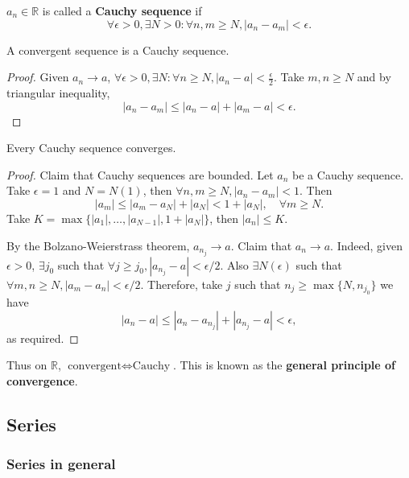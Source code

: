 \begin{definition}
    $a_n\in \mathbb{R}$ is called a \textbf{Cauchy sequence} if 
    \[
        \forall \epsilon>0, \exists N>0: \forall n,m\ge N, \left| a_n-a_m \right| <\epsilon.
    \]
\end{definition}

\begin{lemma}\label{lma:convergent -> cauchy}
    A convergent sequence is a Cauchy sequence.
\end{lemma}
\begin{proof}
    Given $ a_n\to a $, $ \forall \epsilon>0, \exists N: \forall n\ge N, |a_n-a|<\frac{\epsilon}{2} $. Take $m,n\ge N$ and by triangular inequality,
    \[
        |a_n-a_m|\le |a_n-a|+|a_m-a|<\epsilon.
    \]
\end{proof}

\begin{theorem}\label{thm:cauchy -> convergent}
    Every Cauchy sequence converges.
\end{theorem}
\begin{proof}
    Claim that Cauchy sequences are bounded. Let $a_n$ be a Cauchy sequence. Take $\epsilon=1$ and $N=N(1)$, then $ \forall n,m\ge N, |a_n-a_m|<1 $. Then
    \[
        |a_m|\le |a_m-a_N|+|a_N|<1+|a_N|, \quad \forall m\ge N.
    \]
    Take $ K= \max\{|a_1|,\dots,|a_{N-1}|, 1+|a_N|\} $, then $|a_n|\le K$.

    By the Bolzano-Weierstrass theorem, $ a_{n_j}\to a $. Claim that $a_n\to a$. Indeed, given $ \epsilon>0 $, $ \exists j_0 $ such that $ \forall j\ge j_0, |a_{n_j}-a|<\epsilon/2 $. Also $ \exists N(\epsilon) $ such that $ \forall m,n\ge N, |a_m-a_n|<\epsilon/2 $. Therefore, take $j$ such that $ n_j\ge \max \{N, n_{j_0}\} $ we have
    \[
        \left| a_n-a \right| \le \left| a_n-a_{n_j} \right| + \left| a_{n_j} -a\right| < \epsilon,
    \]
    as required.
\end{proof}
\begin{note}
    Thus on $ \mathbb{R} $, $ \text{convergent} \Leftrightarrow \text{Cauchy} $. This is known as the \textbf{general principle of convergence}.
\end{note}

\subsection{Series}
\subsubsection*{Series in general}

